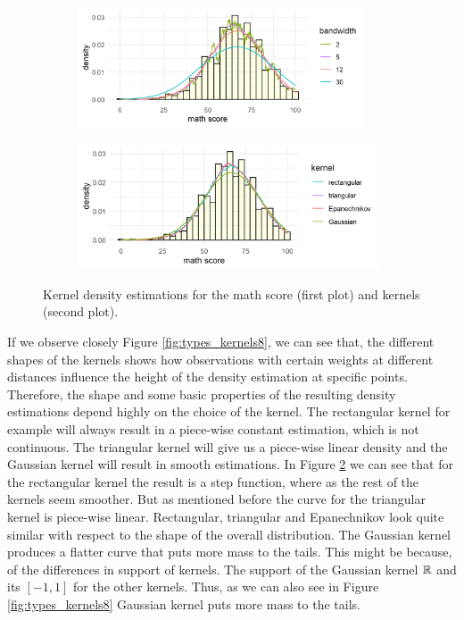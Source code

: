 \begin{figure}[tbh]
\centering
\begin{subfigure}[c]{\textwidth}
\includegraphics[width=0.93\textwidth, keepaspectratio]{ex8/diff_bandwidths.png}
\label{fig:diff_bandwidth8}
\end{subfigure}
\begin{subfigure}[c]{\textwidth}
\includegraphics[width=0.98\textwidth, keepaspectratio]{ex8/diff_ker.png}
\label{fig:diff_ker8}
\end{subfigure}
\caption{Kernel density estimations for the math score  (first plot) and kernels (second plot).}
\label{6fit}
\end{figure}

If we observe closely Figure \ref{fig:types_kernels8}, we can see that, the different shapes of the kernels shows how observations with certain weights at different distances influence the height of the density estimation at specific points. Therefore, the shape and some basic properties of the resulting density estimations depend highly on the choice of the kernel. The rectangular kernel for example will always result in a piece-wise constant estimation, which is not continuous.  The triangular kernel will give us a piece-wise linear density and the Gaussian kernel will result in smooth estimations. In Figure \ref{fig:diff_ker8} we can see that for the rectangular kernel the result is a step function, where as the rest of the kernels seem smoother. But as mentioned before the curve for the triangular kernel is piece-wise linear. Rectangular, triangular and Epanechnikov look quite similar with respect to the shape of the overall distribution. The Gaussian kernel produces a flatter curve that puts more mass to the tails. This might be because, of the differences in support of kernels. The support of the Gaussian kernel $\mathbb{R}$ and its $ [ -1,1] $ for the other kernels. Thus, as we can also see in Figure \ref{fig:types_kernels8} Gaussian kernel puts more mass to the tails.

